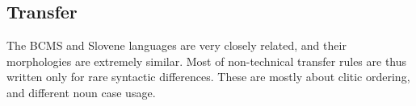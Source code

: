 \subsection{Transfer}
The BCMS and Slovene languages are very closely related, and their
morphologies are extremely similar. Most of non-technical transfer
rules are thus written only for rare syntactic differences. These are
mostly about clitic ordering, and different noun case usage.


